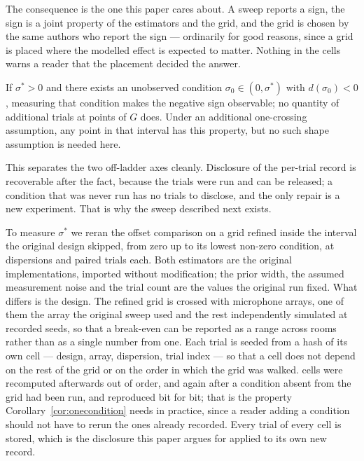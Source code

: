 The consequence is the one this paper cares about. A sweep reports a sign, the
sign is a joint property of the estimators and the grid, and the grid is chosen
by the same authors who report the sign --- ordinarily for good reasons, since a
grid is placed where the modelled effect is expected to matter. Nothing in the
cells warns a reader that the placement decided the answer.

\begin{corollary}\label{cor:onecondition}
If $\sigma^\ast > 0$ and there exists an unobserved condition
$\sigma_0 \in (0,\sigma^\ast)$ with $d(\sigma_0)<0$, measuring that condition
makes the negative sign observable; no quantity of additional trials at points
of $G$ does. Under an additional one-crossing assumption, any point in that
interval has this property, but no such shape assumption is needed here.
\end{corollary}

This separates the two off-ladder axes cleanly. Disclosure of the per-trial
record is recoverable after the fact, because the trials were run and can be
released; a condition that was never run has no trials to disclose, and the only
repair is a new experiment. That is why the sweep described next exists.

To measure $\sigma^\ast$ we reran the offset comparison on a grid refined inside
the interval the original design skipped, from zero up to its lowest non-zero
condition, at \FineLevels{} dispersions and \FineTrials{} paired trials each.
Both estimators are the original implementations, imported without modification;
the prior width, the assumed measurement noise and the trial count are the values
the original run fixed. What differs is the design. The refined grid is crossed
with \FineRooms{} microphone arrays, one of them the array the original sweep
used and the rest independently simulated at recorded seeds, so that a
break-even can be reported as a range across rooms rather than as a single number
from one. Each trial is seeded from a hash of its own cell --- design, array,
dispersion, trial index --- so that a cell does not depend on the rest of the
grid or on the order in which the grid was walked. \IndependenceCells{} cells
were recomputed afterwards out of order, and again after a condition absent from
the grid had been run, and reproduced bit for bit; that is the property
Corollary~\ref{cor:onecondition} needs in practice, since a reader adding a
condition should not have to rerun the ones already recorded. Every trial of
every cell is stored, which is the disclosure this paper argues for applied to
its own new record.

